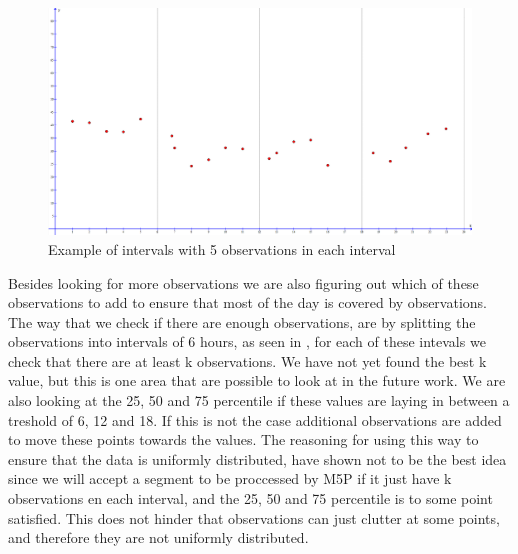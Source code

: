 \begin{figure}
\centering
\includegraphics[width=\textwidth]{figures/intervals.png}
\caption{Example of intervals with 5 observations in each interval}
\label{fig:intervals}
\end{figure}

Besides looking for more observations we are also figuring out which of these observations to add to ensure that most of the day is covered by observations. The way that we check if there are enough observations, are by splitting the observations into intervals of 6 hours, as seen in , for each of these intevals we check that there are at least k observations. We have not yet found the best k value, but this is one area that are possible to look at in the future work. We are also looking at the 25, 50 and 75 percentile if these values are laying in between a treshold of 6, 12 and 18. If this is not the case additional observations are added to move these points towards the values. The reasoning for using this way to ensure that the data is uniformly distributed, have shown not to be the best idea since we will accept a segment to be proccessed by M5P if it just have k observations en each interval, and the 25, 50 and 75 percentile is to some point satisfied. This does not hinder that observations can just clutter at some points, and therefore they are not uniformly distributed.